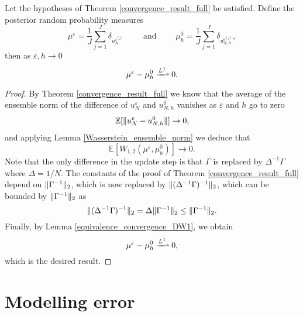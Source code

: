 \begin{theorem}
\label{convergence_posterior_distributions}
Let the hypotheses of Theorem \ref{convergence_result_full} be satisfied. Define the posterior random probability measures
\[ \mu^{\varepsilon} = \frac{1}{J} \sum_{j=1}^J \delta_{u_N^{\varepsilon^{(j)}}} \qquad \text{ and } \qquad \mu_h^{0} = \frac{1}{J} \sum_{j=1}^J \delta_{u_{N,h}^{0^{(j)}}}, \]
then as $\varepsilon, h \to 0$
\[ \mu^{\varepsilon} - \mu_h^0 \xrightharpoonup{L^1} 0. \]
\end{theorem}
\begin{proof}
By Theorem \ref{convergence_result_full} we know that the average of the ensemble norm of the difference of $u_N^{\varepsilon}$ and $u_{N,h}^0$ vanishes as $\varepsilon$ and $h$ go to zero
\[ \mathbb{E} [ \lVert u_N^{\varepsilon} - u_{N,h}^0\rVert ] \to 0, \]
and applying Lemma \ref{Wasserstein_ensemble_norm} we deduce that
\[ \mathbb{E} [ W_{1,2}(\mu^{\varepsilon}, \mu_h^0) ] \to 0. \]
Note that the only difference in the update step is that $\Gamma$ is replaced by $\Delta^{-1} \Gamma$ where $\Delta = 1/N$. The constants of the proof of Theorem \ref{convergence_result_full} depend on $\lVert\Gamma^{-1}\rVert_2$, which is now replaced by $\lVert(\Delta^{-1} \Gamma)^{-1}\rVert_2$, which can be bounded by $\lVert\Gamma^{-1}\rVert_2$ as
\[ \lVert(\Delta^{-1} \Gamma)^{-1}\rVert_2 = \Delta \lVert\Gamma^{-1}\rVert_2 \le \lVert\Gamma^{-1}\rVert_2. \]
Finally, by Lemma \ref{equivalence_convergence_DW1}, we obtain
\[ \mu^{\varepsilon} - \mu_h^0 \xrightharpoonup{L^1} 0, \]
which is the desired result.
\end{proof}

\section{Modelling error}\label{Modelling}

